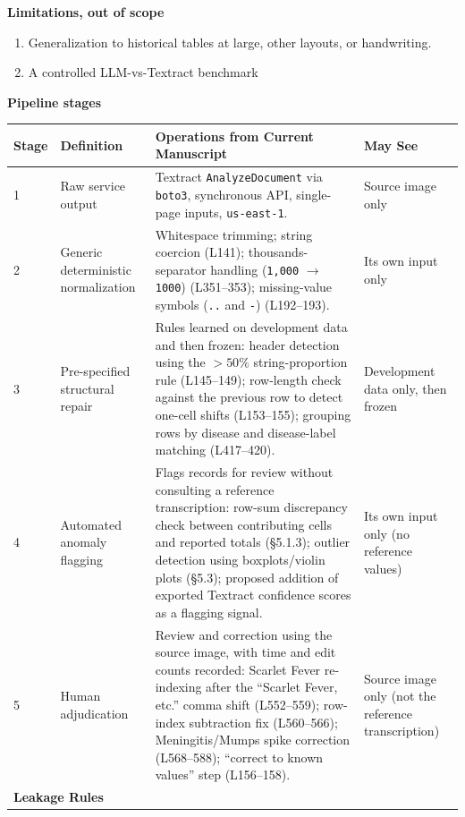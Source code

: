 \documentclass[12pt]{article}
\begin{document}
\textbf{Limitations, out of scope}
\begin{enumerate}
    \item Generalization to historical tables at large, other layouts, or handwriting.
    \item
A controlled LLM-vs-Textract benchmark 
\end{enumerate}
\textbf{Pipeline stages}
\begin{table}[ht]
\centering
\small
\renewcommand{\arraystretch}{1.3}
\begin{tabular}{|p{0.8cm}|p{3.2cm}|p{6.2cm}|p{3.2cm}|}
\hline
\textbf{Stage} & \textbf{Definition} & \textbf{Operations from Current Manuscript} & \textbf{May See} \\
\hline
1 & Raw service output & Textract \texttt{AnalyzeDocument} via \texttt{boto3}, synchronous API, single-page inputs, \texttt{us-east-1}. & Source image only \\
\hline
2 & Generic deterministic normalization & Whitespace trimming; string coercion (L141); thousands-separator handling (\texttt{1,000} $\rightarrow$ \texttt{1000}) (L351--353); missing-value symbols (\texttt{..} and \texttt{-}) (L192--193). & Its own input only \\
\hline
3 & Pre-specified structural repair & Rules learned on development data and then frozen: header detection using the $>50\%$ string-proportion rule (L145--149); row-length check against the previous row to detect one-cell shifts (L153--155); grouping rows by disease and disease-label matching (L417--420). & Development data only, then frozen \\
\hline
4 & Automated anomaly flagging & Flags records for review without consulting a reference transcription: row-sum discrepancy check between contributing cells and reported totals (\S5.1.3); outlier detection using boxplots/violin plots (\S5.3); proposed addition of exported Textract confidence scores as a flagging signal. & Its own input only (no reference values) \\
\hline
5 & Human adjudication & Review and correction using the source image, with time and edit counts recorded: Scarlet Fever re-indexing after the ``Scarlet Fever, etc.'' comma shift (L552--559); row-index subtraction fix (L560--566); Meningitis/Mumps spike correction (L568--588); ``correct to known values'' step (L156--158). & Source image only (not the reference transcription) \\
\hline
\multicolumn{4}{|l|}{\textbf{Leakage Rules}} \\
\hline

\end{tabular}
\end{table}
\end{document}
